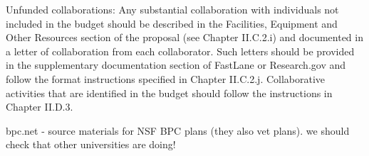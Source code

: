 Unfunded collaborations: Any substantial collaboration with
individuals not included in the budget should be described in the
Facilities, Equipment and Other Resources section of the proposal (see
Chapter II.C.2.i) and documented in a letter of collaboration from
each collaborator. Such letters should be provided in the
supplementary documentation section of FastLane or Research.gov and
follow the format instructions specified in Chapter
II.C.2.j. Collaborative activities that are identified in the budget
should follow the instructions in Chapter II.D.3.  

bpc.net - source materials for NSF BPC plans (they also vet plans).
  we should check that other universities are doing!

\fi
